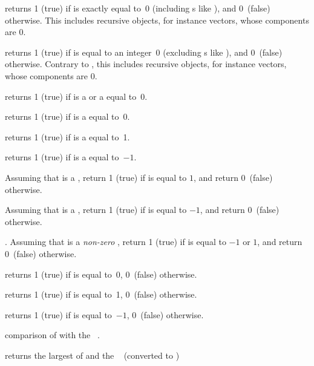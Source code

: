 
 returns 1 (true) if  is exactly equal
to~0 (including s like ), and 0~(false) otherwise.
This includes recursive objects, for instance vectors, whose components are $0$.

 returns 1 (true) if  is equal
to an integer~0 (excluding s like ), and 0~(false)
otherwise. Contrary to , this includes recursive objects, for
instance vectors, whose components are $0$.

 returns 1 (true) if  is a  or
a  equal to~0.

 returns 1 (true) if  is a 
equal to~0.

 returns 1 (true) if  is a 
equal to~1.

 returns 1 (true) if  is a 
equal to~$-1$.

Assuming that  is a , return 1 (true) if  is equal to
$1$, and return 0~(false) otherwise.

Assuming that  is a , return 1 (true) if  is equal to
$-1$, and return 0~(false) otherwise.

. Assuming that  is a
\emph{non-zero} , return 1 (true) if  is equal to $-1$ or
$1$, and return 0~(false) otherwise.

 returns 1 (true) if  is equal to~0, 0~(false)
otherwise.

 returns 1 (true) if  is equal to~1, 0~(false)
otherwise.

 returns 1 (true) if  is equal to~$-1$,
0~(false) otherwise.



 comparison of  with the
~.


 returns the largest of  and
the ~ (converted to )


